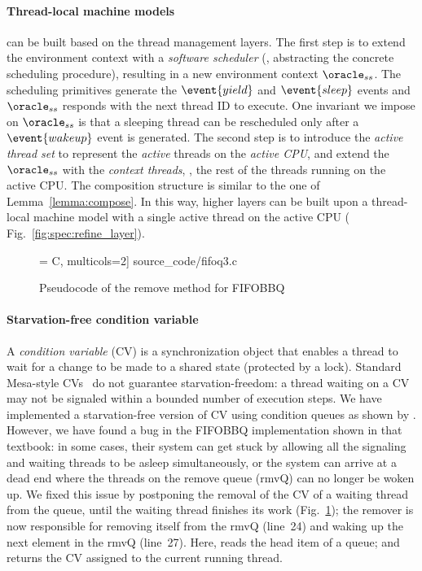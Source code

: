 \paragraph{Thread-local machine models}
can be built based on the thread management layers.  The first
step is to extend the environment context with a \emph{software
  scheduler} (\ie, abstracting the concrete scheduling procedure),
resulting in a new environment context $\oracle_{ss}$.  The scheduling
primitives generate the $\event{yield}$ and $\event{sleep}$ events and
$\oracle_{ss}$ responds with the next thread ID to execute.  One
invariant we impose on $\oracle_{ss}$ is that a sleeping
thread can be rescheduled only after a $\event{wakeup}$ event is
generated.  The second step is to introduce the \emph{active thread
  set} to represent the \emph{active} threads on the \emph{active CPU}, and
extend the $\oracle_{ss}$ with the \emph{context threads}, \ie, the
rest of the threads running on the active CPU. The composition
structure is similar to the one of Lemma~\ref{lemma:compose}.  In this
way, higher layers can be built upon a thread-local machine model with
a single active thread on the active CPU (\cf
Fig.~\ref{fig:spec:refine_layer}).

\begin{figure}[t]
 = C, multicols=2] {source_code/fifoq3.c}
\caption{Pseudocode of the remove method for FIFOBBQ}
\label{fig:exp:fifo}
\vspace*{-5pt}
\end{figure}

\vspace*{-5pt}
\paragraph{Starvation-free condition variable}
A \emph{condition variable} (CV) is a synchronization object that
enables a thread to wait for a change to be made to a
shared state (protected by a lock).  Standard Mesa-style
CVs~\cite{lampson80} do not guarantee starvation-freedom: a thread
waiting on a CV may not be signaled within a bounded number of
execution steps. We have implemented a starvation-free version of CV
using condition queues as shown by \citet[Fig.~5.14]{ospp11}. However,
we have found a bug in the FIFOBBQ implementation shown in that
textbook: in some cases, their system can get stuck by allowing all
the signaling and waiting threads to be asleep simultaneously, or the
system can arrive at a dead end where the threads on the remove queue
(rmvQ) can no longer be woken up.  We fixed this issue by postponing
the removal of the CV of a waiting thread from the queue, until the
waiting thread finishes its work (\cf Fig.~\ref{fig:exp:fifo}); the
remover is now responsible for removing itself from the rmvQ (line~24)
and waking up the next element in the rmvQ (line~27). Here, 
reads the head item of a queue; and  returns the CV
assigned to the current running thread. 

